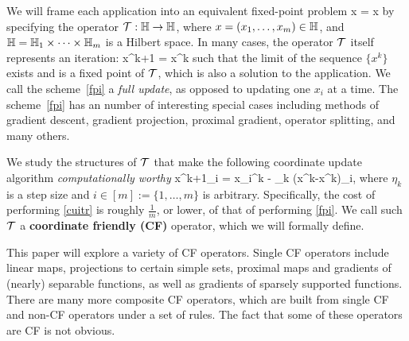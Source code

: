 We will frame each application into an equivalent fixed-point problem
\beq\label{fpprob}
x = \cT x
\eeq
by specifying the operator  ${\mathcal{T}}:\mathbb{H} \to \mathbb{H}$, where $x=(x_1,\ldots,x_m)\in \mathbb{H}$, and $\mathbb{H}=\mathbb{H}_1\times \cdots \times \mathbb{H}_m$ is a Hilbert space.
In many cases, the operator ${\mathcal{T}}$ itself represents an iteration:
\beq\label{fpi}
x^{k+1} = \cT x^k
\eeq
such that the limit of the sequence $\{x^k\}$  exists and is a fixed point of ${\mathcal{T}}$, which is also a solution to the application. We call the scheme~\eqref{fpi} a \emph{full update}, as opposed to updating one $x_i$ at a time. The  scheme~\eqref{fpi} has an number of interesting special cases including  methods of gradient descent, gradient projection, proximal gradient,  operator splitting, and many others.

We study the structures of ${\mathcal{T}}$ that make the  following coordinate update algorithm \emph{computationally worthy}
\beq\label{cuitr}
x^{k+1}_i = x_i^k - \eta_k (x^k-\cT x^k)_i,
\eeq
where  $\eta_k$ is a  step size and $i\in [m] := \{1,\ldots,m\}$ is arbitrary. Specifically, the cost of performing  \eqref{cuitr}  is roughly $\frac{1}{m}$, or lower, of that of performing \eqref{fpi}. We call such ${\mathcal{T}}$ a \textbf{coordinate friendly (CF)} operator, which we will formally define.

This paper will explore a variety of CF operators. Single CF operators include linear maps, projections to certain simple sets, proximal maps and gradients of (nearly) separable functions, as well as gradients of sparsely supported functions. There are many more composite CF operators, which are built from single CF and non-CF operators under a set of rules.  The fact that some of these operators are CF is not obvious.

